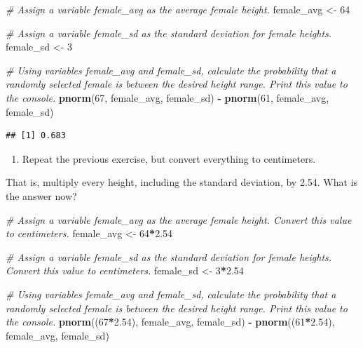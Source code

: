 \documentclass[
]{article}
\newenvironment{Shaded}{\begin{snugshade}}{\end{snugshade}}
\newcommand{\CommentTok}[1]{\textcolor[rgb]{0.56,0.35,0.01}{\textit{#1}}}
\newcommand{\DecValTok}[1]{\textcolor[rgb]{0.00,0.00,0.81}{#1}}
\newcommand{\FloatTok}[1]{\textcolor[rgb]{0.00,0.00,0.81}{#1}}
\newcommand{\KeywordTok}[1]{\textcolor[rgb]{0.13,0.29,0.53}{\textbf{#1}}}
\newcommand{\NormalTok}[1]{#1}
\newcommand{\OperatorTok}[1]{\textcolor[rgb]{0.81,0.36,0.00}{\textbf{#1}}}
\newcommand{\StringTok}[1]{\textcolor[rgb]{0.31,0.60,0.02}{#1}}
\providecommand{\tightlist}{%
  \setlength{\itemsep}{0pt}\setlength{\parskip}{0pt}}
\begin{document}
\begin{Shaded}
\begin{Highlighting}[]
\CommentTok{\# Assign a variable \textquotesingle{}female\_avg\textquotesingle{} as the average female height.}
\NormalTok{female\_avg \textless{}{-}}\StringTok{ }\DecValTok{64}

\CommentTok{\# Assign a variable \textquotesingle{}female\_sd\textquotesingle{} as the standard deviation for female heights.}
\NormalTok{female\_sd \textless{}{-}}\StringTok{ }\DecValTok{3}

\CommentTok{\# Using variables \textquotesingle{}female\_avg\textquotesingle{} and \textquotesingle{}female\_sd\textquotesingle{}, calculate the probability that a randomly selected female is between the desired height range. Print this value to the console.}
\KeywordTok{pnorm}\NormalTok{(}\DecValTok{67}\NormalTok{, female\_avg, female\_sd) }\OperatorTok{{-}}\StringTok{ }\KeywordTok{pnorm}\NormalTok{(}\DecValTok{61}\NormalTok{, female\_avg, female\_sd)}
\end{Highlighting}
\end{Shaded}

\begin{verbatim}
## [1] 0.683
\end{verbatim}

\begin{enumerate}
\def\labelenumi{\arabic{enumi}.}
\setcounter{enumi}{3}
\tightlist
\item
  Repeat the previous exercise, but convert everything to centimeters.
\end{enumerate}

That is, multiply every height, including the standard deviation, by
2.54. What is the answer now?

\begin{Shaded}
\begin{Highlighting}[]
\CommentTok{\# Assign a variable \textquotesingle{}female\_avg\textquotesingle{} as the average female height. Convert this value to centimeters.}
\NormalTok{female\_avg \textless{}{-}}\StringTok{ }\DecValTok{64}\OperatorTok{*}\FloatTok{2.54}

\CommentTok{\# Assign a variable \textquotesingle{}female\_sd\textquotesingle{} as the standard deviation for female heights. Convert this value to centimeters.}
\NormalTok{female\_sd \textless{}{-}}\StringTok{ }\DecValTok{3}\OperatorTok{*}\FloatTok{2.54}

\CommentTok{\# Using variables \textquotesingle{}female\_avg\textquotesingle{} and \textquotesingle{}female\_sd\textquotesingle{}, calculate the probability that a randomly selected female is between the desired height range. Print this value to the console.}
\KeywordTok{pnorm}\NormalTok{((}\DecValTok{67}\OperatorTok{*}\FloatTok{2.54}\NormalTok{), female\_avg, female\_sd) }\OperatorTok{{-}}\StringTok{ }\KeywordTok{pnorm}\NormalTok{((}\DecValTok{61}\OperatorTok{*}\FloatTok{2.54}\NormalTok{), female\_avg, female\_sd)}
\end{Highlighting}
\end{Shaded}
\end{document}
